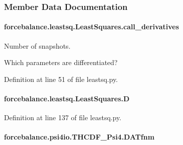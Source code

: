 \subsubsection{Member Data Documentation}
\hypertarget{classforcebalance_1_1leastsq_1_1LeastSquares_a58b3039968f72ab1a98e18deed0f8a0a}{
\paragraph[{call\-\_\-derivatives}]{\setlength{\rightskip}{0pt plus 5cm}forcebalance.\-leastsq.\-Least\-Squares.\-call\-\_\-derivatives\hspace{0.3cm}{\ttfamily [inherited]}}}\label{classforcebalance_1_1leastsq_1_1LeastSquares_a58b3039968f72ab1a98e18deed0f8a0a}


Number of snapshots. 

Which parameters are differentiated? 

Definition at line 51 of file leastsq.\-py.

\hypertarget{classforcebalance_1_1leastsq_1_1LeastSquares_aa2565a2a75466e9f759ba3a67b85d0d2}{
\paragraph[{D}]{\setlength{\rightskip}{0pt plus 5cm}forcebalance.\-leastsq.\-Least\-Squares.\-D\hspace{0.3cm}{\ttfamily [inherited]}}}\label{classforcebalance_1_1leastsq_1_1LeastSquares_aa2565a2a75466e9f759ba3a67b85d0d2}


Definition at line 137 of file leastsq.\-py.

\hypertarget{classforcebalance_1_1psi4io_1_1THCDF__Psi4_a939888d130078cd0b36e3e19a9d0585a}{
\paragraph[{D\-A\-Tfnm}]{\setlength{\rightskip}{0pt plus 5cm}forcebalance.\-psi4io.\-T\-H\-C\-D\-F\-\_\-\-Psi4.\-D\-A\-Tfnm}}\label{classforcebalance_1_1psi4io_1_1THCDF__Psi4_a939888d130078cd0b36e3e19a9d0585a}



